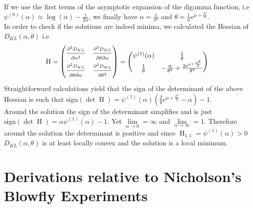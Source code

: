 \documentclass[12pt]{article}
\begin{document}
\begin{appendices}
	If we use the first terms of the asymptotic expansion of the digamma function, i.e $\psi^{(0)}(\alpha) \approx \log(\alpha)-\frac{1}{2\alpha}$, we finally have $\alpha =\frac{1}{\sigma^2}$ and $\theta=\frac{1}{\alpha}e^{\mu+\frac{\sigma^2}{2}}$. \\
	
	In order to check if the solutions are indeed minima, we calculated the Hessian of $D_{KL}(\alpha, \theta)$ i.e
	\begin{equation*}
	\text{H} = \begin{pmatrix}
	\frac{\strut \partial^2 D_{KL}}{\strut \partial \alpha^2} & \frac{\strut \partial^2 D_{KL}}{\strut \partial \theta \partial \alpha} \\
	\frac{\strut \partial^2 D_{KL}}{\strut \partial \theta \partial \alpha} & \frac{\strut \partial^2 D_{KL}}{\strut \partial \theta^2} 
	\end{pmatrix} =
	\begin{pmatrix}
	\psi^{(1)}(\alpha) & \frac{1}{\theta} \\
	\frac{1}{\theta} & -\frac{\alpha}{\theta^2}+\frac{2e^{\mu +\frac{\sigma^2}{2}}}{\theta^3}
	\end{pmatrix}
	\end{equation*}
	Straightforward calculations yield that the sign of the determinant of the above Hessian is such that $\text{sign}(\det{\operatorname{H}}) = \psi^{(1)}(\alpha)(\frac{2}{\theta}e^{\mu +\frac{\sigma^2}{2}} - \alpha) - 1$. \\
	Around the solution the sign of the determinant simplifies and is just $\text{sign}(\det{\operatorname{H}}) = \alpha\psi^{(1)}(\alpha) - 1$. Yet $\lim\limits_{\alpha \rightarrow 0} = \infty$ and $\lim\limits_{\alpha \rightarrow \infty} = 1$. Therefore around the solution the determinant is positive and since $\operatorname{H}_{1,1} = \psi^{(1)}(\alpha) > 0$ $D_{KL}(\alpha, \theta)$ is at least locally convex and the solution is a local minimum.
	
	\section{Derivations relative to Nicholson's Blowfly Experiments} \label{AppendBlowfly}

\end{appendices}
\end{document}
